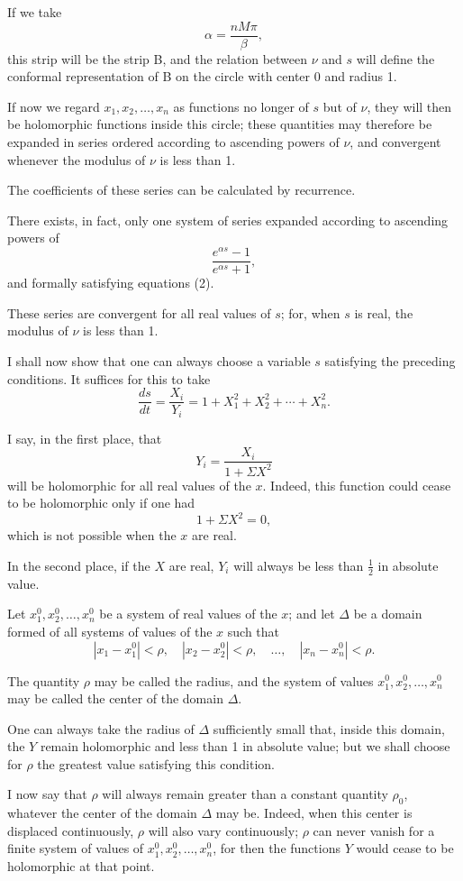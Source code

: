\documentclass[11pt]{article}
\begin{document}
If we take
\[
\alpha=\frac{nM\pi}{\beta},
\]
this strip will be the strip B, and the relation between $\nu$ and $s$ will define the conformal representation of B on the circle with center 0 and radius 1.

If now we regard $x_1,x_2,\ldots,x_n$ as functions no longer of $s$ but of $\nu$, they will then be holomorphic functions inside this circle; these quantities may therefore be expanded in series ordered according to ascending powers of $\nu$, and convergent whenever the modulus of $\nu$ is less than 1.

The coefficients of these series can be calculated by recurrence.

There exists, in fact, only one system of series expanded according to ascending powers of
\[
\frac{e^{\alpha s}-1}{e^{\alpha s}+1},
\]
and formally satisfying equations (2).

These series are convergent for all real values of $s$; for, when $s$ is real, the modulus of $\nu$ is less than 1.

I shall now show that one can always choose a variable $s$ satisfying the preceding conditions. It suffices for this to take
\[
\frac{ds}{dt}=\frac{X_i}{Y_i}=1+X_1^2+X_2^2+\cdots+X_n^2.
\]

I say, in the first place, that
\[
Y_i=\frac{X_i}{1+\Sigma X^2}
\]
will be holomorphic for all real values of the $x$. Indeed, this function could cease to be holomorphic only if one had
\[
1+\Sigma X^2=0,
\]
which is not possible when the $x$ are real.

In the second place, if the $X$ are real, $Y_i$ will always be less than $\frac12$ in absolute value.

Let $x_1^0,x_2^0,\ldots,x_n^0$ be a system of real values of the $x$; and let $\Delta$ be a domain formed of all systems of values of the $x$ such that
\[
|x_1-x_1^0|<\rho,
\quad |x_2-x_2^0|<\rho,
\quad \ldots,
\quad |x_n-x_n^0|<\rho.
\]

The quantity $\rho$ may be called the radius, and the system of values $x_1^0,x_2^0,\ldots,x_n^0$ may be called the center of the domain $\Delta$.

One can always take the radius of $\Delta$ sufficiently small that, inside this domain, the $Y$ remain holomorphic and less than 1 in absolute value; but we shall choose for $\rho$ the greatest value satisfying this condition.

I now say that $\rho$ will always remain greater than a constant quantity $\rho_0$, whatever the center of the domain $\Delta$ may be. Indeed, when this center is displaced continuously, $\rho$ will also vary continuously; $\rho$ can never vanish for a finite system of values of $x_1^0,x_2^0,\ldots,x_n^0$, for then the functions $Y$ would cease to be holomorphic at that point.
\end{document}
